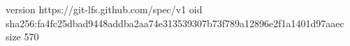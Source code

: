 version https://git-lfs.github.com/spec/v1
oid sha256:fa4fc25dbad9448addba2aa74e313539307b73f789a12896e2f1a1401d97aaec
size 570
